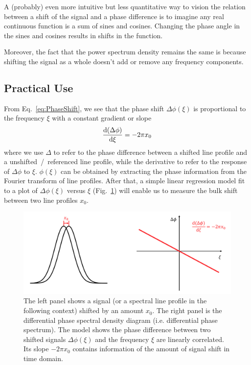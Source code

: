 A (probably) even more intuitive but less quantitative way to vision the relation between a shift of the signal and a phase difference is to imagine any real continuous function is a sum of sines and cosines. Changing the phase angle in the sines and cosines results in shifts in the function. 

Moreover, the fact that the power spectrum density remains the same is because shifting the signal as a whole doesn't add or remove any frequency components. 


\subsection{Practical Use}

From Eq.~\ref{eq:PhaseShift}, we see that the phase shift $\Delta \phi(\xi)$ is proportional to the frequency $\xi$ with a constant gradient or slope
\begin{equation}
	\dv{(\Delta \phi)}{\xi} = -2 \pi x_0
\label{eq:gradient}
\end{equation}
where we use $\Delta$ to refer to the phase difference between a shifted line profile and a unshifted~/~referenced line profile, while the derivative to refer to the response of $\Delta \phi$ to $\xi$. $\phi(\xi)$ can be obtained by extracting the phase information from the Fourier transform of line profiles. After that, a simple linear regression model fit to a plot of $\Delta \phi(\xi)$ versus $\xi$ (Fig.~\ref{fig:FT}) will enable us to measure the bulk shift between two line profiles $x_0$. 

\begin{figure}[tbp]
\centering
\includegraphics[width = 0.99 \linewidth]
{./Figures/Methods/FT.png}
\caption[Translation property of Fourier transform]
{The left panel shows a signal (or a spectral line profile in the following context) shifted by an amount $x_0$. 
The right panel is the differential phase spectral density diagram (i.e. differential phase spectrum). 
The model shows the phase difference between two shifted signals $\Delta \phi(\xi)$ and the frequency $\xi$ are linearly correlated. Its slope $-2 \pi x_0$ contains information of the amount of signal shift in time domain.}
\label{fig:FT}
\end{figure} 

